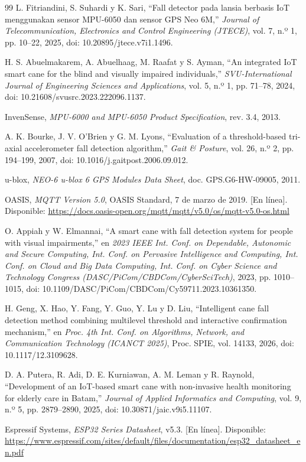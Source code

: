 \documentclass[conference,a4paper]{IEEEtran}
\begin{document}
\begin{thebibliography}{99}
L. Fitriandini, S. Suhardi y K. Sari, ``Fall detector pada lansia berbasis IoT menggunakan sensor MPU-6050 dan sensor GPS Neo 6M,'' \emph{Journal of Telecommunication, Electronics and Control Engineering (JTECE)}, vol. 7, n.º 1, pp. 10--22, 2025, doi: 10.20895/jtece.v7i1.1496.

H. S. Abuelmakarem, A. Abuelhaag, M. Raafat y S. Ayman, ``An integrated IoT smart cane for the blind and visually impaired individuals,'' \emph{SVU-International Journal of Engineering Sciences and Applications}, vol. 5, n.º 1, pp. 71--78, 2024, doi: 10.21608/svusrc.2023.222096.1137.

InvenSense, \emph{MPU-6000 and MPU-6050 Product Specification}, rev. 3.4, 2013.

A. K. Bourke, J. V. O'Brien y G. M. Lyons, ``Evaluation of a threshold-based tri-axial accelerometer fall detection algorithm,'' \emph{Gait \& Posture}, vol. 26, n.º 2, pp. 194--199, 2007, doi: 10.1016/j.gaitpost.2006.09.012.

u-blox, \emph{NEO-6 u-blox 6 GPS Modules Data Sheet}, doc. GPS.G6-HW-09005, 2011.

OASIS, \emph{MQTT Version 5.0}, OASIS Standard, 7 de marzo de 2019. [En línea]. Disponible: \url{https://docs.oasis-open.org/mqtt/mqtt/v5.0/os/mqtt-v5.0-os.html}

O. Appiah y W. Elmannai, ``A smart cane with fall detection system for people with visual impairments,'' en \emph{2023 IEEE Int. Conf. on Dependable, Autonomic and Secure Computing, Int. Conf. on Pervasive Intelligence and Computing, Int. Conf. on Cloud and Big Data Computing, Int. Conf. on Cyber Science and Technology Congress (DASC/PiCom/CBDCom/CyberSciTech)}, 2023, pp. 1010--1015, doi: 10.1109/DASC/PiCom/CBDCom/Cy59711.2023.10361350.

H. Geng, X. Hao, Y. Fang, Y. Guo, Y. Lu y D. Liu, ``Intelligent cane fall detection method combining multilevel threshold and interactive confirmation mechanism,'' en \emph{Proc. 4th Int. Conf. on Algorithms, Network, and Communication Technology (ICANCT 2025)}, Proc. SPIE, vol. 14133, 2026, doi: 10.1117/12.3109628.

D. A. Putera, R. Adi, D. E. Kurniawan, A. M. Leman y R. Raynold, ``Development of an IoT-based smart cane with non-invasive health monitoring for elderly care in Batam,'' \emph{Journal of Applied Informatics and Computing}, vol. 9, n.º 5, pp. 2879--2890, 2025, doi: 10.30871/jaic.v9i5.11107.

Espressif Systems, \emph{ESP32 Series Datasheet}, v5.3. [En línea]. Disponible: \url{https://www.espressif.com/sites/default/files/documentation/esp32_datasheet_en.pdf}

\end{thebibliography}
\end{document}
